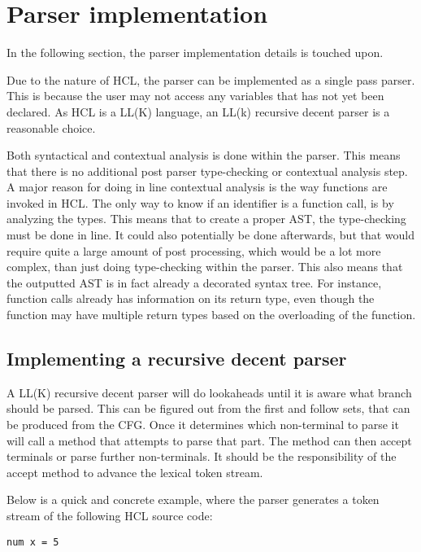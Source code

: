 \section{Parser implementation}
\label{sec:parser_impl}
\label{parserImplemention}
In the following section, the parser implementation details is touched upon.

Due to the nature of HCL, the parser can be implemented as a single pass parser. 
This is because the user may not access any variables that has not yet been declared. 
As HCL is a LL(K) language, an LL(k) recursive decent parser is a reasonable choice.

Both syntactical and contextual analysis is done within the parser. 
This means that there is no additional post parser type-checking or contextual analysis step. 
A major reason for doing in line contextual analysis is the way functions are invoked in HCL. 
The only way to know if an identifier is a function call, is by analyzing the types. 
This means that to create a proper AST, the type-checking must be done in line. 
It could also potentially be done afterwards, but that would require quite a large amount of post processing, which would be a lot more complex, than just doing type-checking within the parser. 
This also means that the outputted AST is in fact already a decorated syntax tree. 
For instance, function calls already has information on its return type, even though the function may have multiple return types based on the overloading of the function.

\subsection{Implementing a recursive decent parser}
A LL(K) recursive decent parser will do lookaheads until it is aware what branch should be parsed.
This can be figured out from the first and follow sets, that can be produced from the CFG.
Once it determines which non-terminal to parse it will call a method that attempts to parse that part.
The method can then accept terminals or parse further non-terminals.
It should be the responsibility of the accept method to advance the lexical token stream.

Below is a quick and concrete example, where the parser generates a token stream of the following HCL source code:
\begin{lstlisting}[language=HCL,label=lis:typedclsParserNum,firstnumber=1]
num x = 5
\end{lstlisting}

